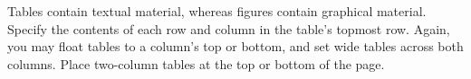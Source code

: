 \documentclass{article}
\begin{document}
Tables contain textual material, whereas figures contain graphical material.
Specify the contents of each row and column in the table's topmost
row. Again, you may float tables to a column's top or bottom, and set
wide tables across both columns. Place two-column tables at the
top or bottom of the page.


\nocite{langley00}



\end{document}
